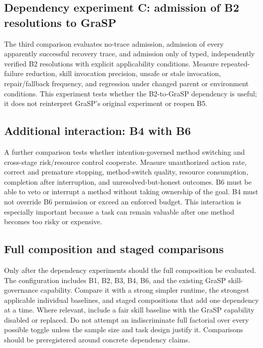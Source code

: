 \subsection{Dependency experiment C: admission of B2 resolutions to GraSP}
\label{subsec:ch18-ablation-recovery-trace-admission}

The third comparison evaluates no-trace admission, admission of every apparently successful recovery trace, and admission only of typed, independently verified B2 resolutions with explicit applicability conditions. Measure repeated-failure reduction, skill invocation precision, unsafe or stale invocation, repair/fallback frequency, and regression under changed parent or environment conditions. This experiment tests whether the B2-to-GraSP dependency is useful; it does not reinterpret GraSP's original experiment or reopen B5.

\subsection{Additional interaction: B4 with B6}
\label{subsec:ch18-ablation-b4-b6}

A further comparison tests whether intention-governed method switching and cross-stage risk/resource control cooperate. Measure unauthorized action rate, correct and premature stopping, method-switch quality, resource consumption, completion after interruption, and unresolved-but-honest outcomes. B6 must be able to veto or interrupt a method without taking ownership of the goal. B4 must not override B6 permission or exceed an enforced budget. This interaction is especially important because a task can remain valuable after one method becomes too risky or expensive.

\subsection{Full composition and staged comparisons}
\label{subsec:ch18-full-composition}

Only after the dependency experiments should the full composition be evaluated. The configuration includes B1, B2, B3, B4, B6, and the existing GraSP skill-governance capability. Compare it with a strong simpler runtime, the strongest applicable individual baselines, and staged compositions that add one dependency at a time. Where relevant, include a fair skill baseline with the GraSP capability disabled or replaced. Do not attempt an indiscriminate full factorial over every possible toggle unless the sample size and task design justify it. Comparisons should be preregistered around concrete dependency claims.

